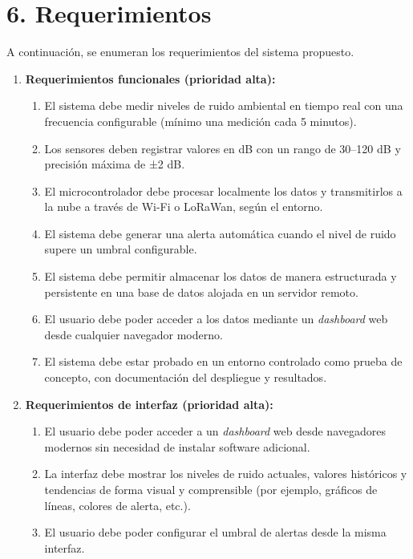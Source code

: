 \documentclass[
11pt, %
]{charter}
\begin{document}
\section{6. Requerimientos}
\label{sec:requerimientos}

A continuación, se enumeran los requerimientos del sistema propuesto.

\begin{enumerate}
    \item \textbf{Requerimientos funcionales (prioridad alta):}
    \begin{enumerate}
        \item El sistema debe medir niveles de ruido ambiental en tiempo real con una frecuencia configurable (mínimo una medición cada 5 minutos).
        \item Los sensores deben registrar valores en dB con un rango de 30–120 dB y precisión máxima de ±2 dB.
        \item El microcontrolador debe procesar localmente los datos y transmitirlos a la nube a través de Wi-Fi o LoRaWan, según el entorno.
        \item El sistema debe generar una alerta automática cuando el nivel de ruido supere un umbral configurable.
        \item El sistema debe permitir almacenar los datos de manera estructurada y persistente en una base de datos alojada en un servidor remoto.
        \item El usuario debe poder acceder a los datos mediante un \textit{dashboard} web desde cualquier navegador moderno.
        \item El sistema debe estar probado en un entorno controlado como prueba de concepto, con documentación del despliegue y resultados.
    \end{enumerate}

    \item \textbf{Requerimientos de interfaz (prioridad alta):}
    \begin{enumerate}
        \item El usuario debe poder acceder a un \textit{dashboard} web desde navegadores modernos sin necesidad de instalar software adicional.
        \item La interfaz debe mostrar los niveles de ruido actuales, valores históricos y tendencias de forma visual y comprensible (por ejemplo, gráficos de líneas, colores de alerta, etc.).
        \item El usuario debe poder configurar el umbral de alertas desde la misma interfaz.
    \end{enumerate}


\end{enumerate}
\end{document}
